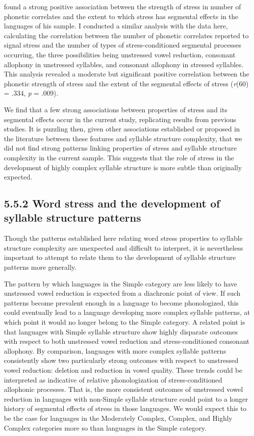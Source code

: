   \citet{Schiering2007} found a strong positive association between the strength of stress in number of phonetic correlates and the extent to which stress has segmental effects in the languages of his sample. I conducted a similar analysis with the data here, calculating the correlation between the number of phonetic correlates reported to signal stress and the number of types of stress-conditioned segmental processes occurring, the three possibilities being unstressed vowel reduction, consonant allophony in unstressed syllables, and consonant allophony in stressed syllables. This analysis revealed a moderate but significant positive correlation between the phonetic strength of stress and the extent of the segmental effects of stress (\textit{r}(60) = .334, \textit{p} = .009).

  We find that a few strong associations between properties of stress and its segmental effects occur in the current study, replicating results from previous studies. It is puzzling then, given other associations established or proposed in the literature between these features and syllable structure complexity, that we did not find strong patterns linking properties of stress and syllable structure complexity in the current sample. This suggests that the role of stress in the development of highly complex syllable structure is more subtle than originally expected.

\subsection{5.5.2 Word stress and the development of syllable structure patterns}

  Though the patterns established here relating word stress properties to syllable structure complexity are unexpected and difficult to interpret, it is nevertheless important to attempt to relate them to the development of syllable structure patterns more generally.

  The pattern by which languages in the Simple category are less likely to have unstressed vowel reduction is expected from a diachronic point of view. If such patterns become prevalent enough in a language to become phonologized, this could eventually lead to a language developing more complex syllable patterns, at which point it would no longer belong to the Simple category. A related point is that languages with Simple syllable structure show highly disparate outcomes with respect to both unstressed vowel reduction and stress-conditioned consonant allophony. By comparison, languages with more complex syllable patterns consistently show two particularly strong outcomes with respect to unstressed vowel reduction: deletion and reduction in vowel quality. These trends could be interpreted as indicative of relative phonologization of stress-conditioned allophonic processes. That is, the more consistent outcomes of unstressed vowel reduction in languages with non-Simple syllable structure could point to a longer history of segmental effects of stress in those languages. We would expect this to be the case for languages in the Moderately Complex, Complex, and Highly Complex categories more so than languages in the Simple category. 

